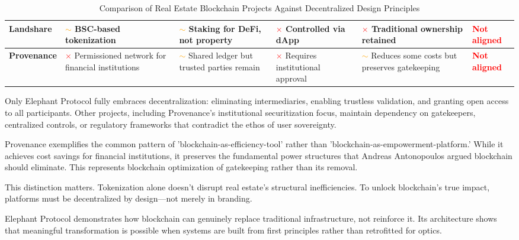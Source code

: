 \begin{table}[H]
\begin{tabular}{|p{1.4cm}|p{2.3cm}|p{2.3cm}|p{2.3cm}|p{2.3cm}|p{1.8cm}|}
\hline
\textbf{Landshare} & 
\textcolor{orange}{$\sim$} BSC-based tokenization & 
\textcolor{orange}{$\sim$} Staking for DeFi, not property & 
\textcolor{red}{$\times$} Controlled via dApp & 
\textcolor{red}{$\times$} Traditional ownership retained & 
\textcolor{red}{\textbf{Not aligned}} \\
\hline
\textbf{Provenance} & 
\textcolor{red}{$\times$} Permissioned network for financial institutions & 
\textcolor{orange}{$\sim$} Shared ledger but trusted parties remain & 
\textcolor{red}{$\times$} Requires institutional approval & 
\textcolor{orange}{$\sim$} Reduces some costs but preserves gatekeeping & 
\textcolor{red}{\textbf{Not aligned}} \\
\hline
\end{tabular}
\caption{Comparison of Real Estate Blockchain Projects Against Decentralized Design Principles}
\end{table}

Only Elephant Protocol fully embraces decentralization: eliminating intermediaries, enabling trustless validation, and granting open access to all participants. Other projects, including Provenance's institutional securitization focus, maintain dependency on gatekeepers, centralized controls, or regulatory frameworks that contradict the ethos of user sovereignty.

Provenance exemplifies the common pattern of 'blockchain-as-efficiency-tool' rather than 'blockchain-as-empowerment-platform.' While it achieves cost savings for financial institutions, it preserves the fundamental power structures that Andreas Antonopoulos argued blockchain should eliminate. This represents blockchain optimization of gatekeeping rather than its removal.

This distinction matters. Tokenization alone doesn't disrupt real estate's structural inefficiencies. To unlock blockchain's true impact, platforms must be decentralized by design—not merely in branding.

Elephant Protocol demonstrates how blockchain can genuinely replace traditional infrastructure, not reinforce it. Its architecture shows that meaningful transformation is possible when systems are built from first principles rather than retrofitted for optics.